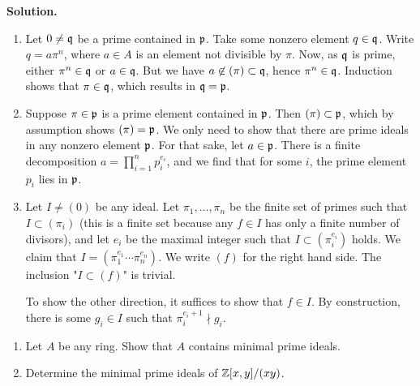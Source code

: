 \documentclass[a4paper,11pt]{article}
\begin{document}
\textbf{Solution.}
\begin{enumerate}
    \item Let $0 \neq \mathfrak{q}$ be a prime contained in $\mathfrak{p}$. Take some nonzero
        element $q \in \mathfrak{q}$. Write $q = a \pi^n$, where $a \in A$ is an element
        not divisible by $\pi$. Now, as $\mathfrak{q}$ is prime, either $\pi^n \in \mathfrak{q}$ or 
        $a \in \mathfrak{q}$. But we have $a \not \in (\pi) \subset \mathfrak{q}$, hence
        $\pi^n \in \mathfrak{q}$. Induction shows that $\pi \in \mathfrak{q}$, which results in
        $\mathfrak{q} = \mathfrak{p}$. 

    \item Suppose $\pi \in \mathfrak{p}$ is a prime element contained in $\mathfrak{p}$. Then
        $(\pi) \subset \mathfrak{p}$, which by assumption shows $(\pi) = \mathfrak{p}$. 
        We only need to show that there are prime ideals in any
        nonzero element $\mathfrak{p}$. For that sake, let $a \in \mathfrak{p}$. There is a finite
        decomposition $a = \prod_{i=1}^n p_i^{e_i}$, and we find 
        that for some $i$, the prime element $p_i$ lies in $\mathfrak{p}$. 

    \item Let $I \neq (0)$ be any ideal. Let $\pi_1, \dots, \pi_n$ be the
        finite set of primes such that $I \subset (\pi_i)$ (this is a finite set
        because any $f \in I$ has only a finite number of divisors), and let
        $e_i$ be the maximal integer such that $I \subset (\pi_i^{e_i})$ holds.
        We claim that $I = (\pi_1^{e_1} \cdots \pi_n^{e_n})$. We write $(f)$
        for the right hand side. The inclusion "$I \subset (f)$" is trivial. 

        To show the other direction, it suffices to show that $f \in I$. By 
        construction, there is some $g_i \in I$ such that $\pi_i^{e_i + 1}
        \nmid g_i$. 


\end{enumerate}

\begin{enumerate}
    \item Let $A$ be any ring. Show that $A$ contains minimal prime ideals. 
    \item Determine the minimal prime ideals of $\mathbb{Z}[x,y]/(xy)$. 
\end{enumerate}
\end{document}
